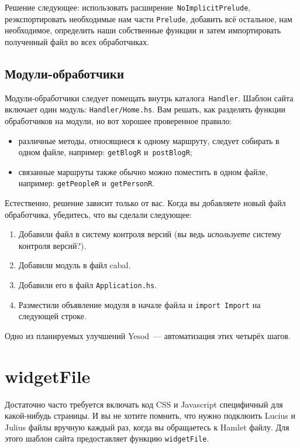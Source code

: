Решение следующее: использовать расширение~\lstinline!NoImplicitPrelude!,
реэкспортировать необходимые нам части \lstinline!Prelude!, добавить всё
остальное, нам необходимое, определить наши собственные функции и затем
импортировать полученный файл во всех обработчиках.

\subsection{Модули-обработчики}
Модули-обработчики следует помещать внутрь каталога~\lstinline!Handler!. Шаблон
сайта включает один модуль: \texttt{Handler/Home.hs}. Вам решать, как разделять
функции обработчиков на модули, но вот хорошее проверенное правило:
\begin{itemize}
  \item различные методы, относящиеся к одному маршруту, следует собирать в
      одном файле, например: \lstinline!getBlogR! и~\lstinline!postBlogR!;
  \item связанные маршруты также обычно можно поместить в одном файле, например:
      \lstinline!getPeopleR! и~\lstinline!getPersonR!.
\end{itemize}

Естественно, решение зависит только от вас. Когда вы добавляете новый файл
обработчика, убедитесь, что вы сделали следующее:
\begin{enumerate}
  \item Добавили файл в систему контроля версий (вы ведь \emph{используете}
      систему контроля версий?).
  \item Добавили модуль в файл cabal.
  \item Добавили его в файл \texttt{Application.hs}.
  \item Разместили объявление модуля в начале файла и \lstinline!import Import!
      на следующей строке.
\end{enumerate}

\begin{remark}
  Одно из планируемых улучшений Yesod~--- автоматизация этих четырёх шагов.
\end{remark}

\section{widgetFile}

Достаточно часто требуется включать код CSS и Javascript специфичный для какой-нибудь страницы.
И вы не хотите помнить, что нужно подклюить Lucius и Julius файлы вручную каждый раз,
когда вы обращаетесь к Hamlet файлу. Для этого шаблон сайта предоставляет
функцию \lstinline!widgetFile!.

